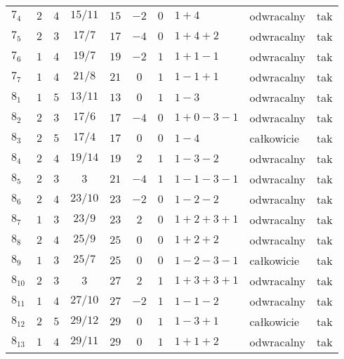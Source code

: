 \begin{longtable}{lccccccllc}
$7_{4}$     &  $2$     &  $4$  &  $15/11$  &  $15$   &  $-2$  &  $0$  &  $1+4$          &  odwracalny  &  tak  \\
$7_{5}$     &  $2$     &  $3$  &  $17/7$   &  $17$   &  $-4$  &  $0$  &  $1+4+2$        &  odwracalny  &  tak  \\
$7_{6}$     &  $1$     &  $4$  &  $19/7$   &  $19$   &  $-2$  &  $1$  &  $1+1-1$        &  odwracalny  &  tak  \\
$7_{7}$     &  $1$     &  $4$  &  $21/8$   &  $21$   &  $0$   &  $1$  &  $1-1+1$        &  odwracalny  &  tak  \\
$8_{1}$     &  $1$     &  $5$  &  $13/11$  &  $13$   &  $0$   &  $1$  &  $1-3$          &  odwracalny  &  tak  \\
$8_{2}$     &  $2$     &  $3$  &  $17/6$   &  $17$   &  $-4$  &  $0$  &  $1+0-3-1$      &  odwracalny  &  tak  \\
$8_{3}$     &  $2$     &  $5$  &  $17/4$   &  $17$   &  $0$   &  $0$  &  $1-4$          &  całkowicie  &  tak  \\
$8_{4}$     &  $2$     &  $4$  &  $19/14$  &  $19$   &  $2$   &  $1$  &  $1-3-2$        &  odwracalny  &  tak  \\
$8_{5}$     &  $2$     &  $3$  &  $3$      &  $21$   &  $-4$  &  $1$  &  $1-1-3-1$      &  odwracalny  &  tak  \\
$8_{6}$     &  $2$     &  $4$  &  $23/10$  &  $23$   &  $-2$  &  $0$  &  $1-2-2$        &  odwracalny  &  tak  \\
$8_{7}$     &  $1$     &  $3$  &  $23/9$   &  $23$   &  $2$   &  $0$  &  $1+2+3+1$      &  odwracalny  &  tak  \\
$8_{8}$     &  $2$     &  $4$  &  $25/9$   &  $25$   &  $0$   &  $0$  &  $1+2+2$        &  odwracalny  &  tak  \\
$8_{9}$     &  $1$     &  $3$  &  $25/7$   &  $25$   &  $0$   &  $0$  &  $1-2-3-1$      &  całkowicie  &  tak  \\
$8_{10}$    &  $2$     &  $3$  &  $3$      &  $27$   &  $2$   &  $1$  &  $1+3+3+1$      &  odwracalny  &  tak  \\
$8_{11}$    &  $1$     &  $4$  &  $27/10$  &  $27$   &  $-2$  &  $1$  &  $1-1-2$        &  odwracalny  &  tak  \\
$8_{12}$    &  $2$     &  $5$  &  $29/12$  &  $29$   &  $0$   &  $1$  &  $1-3+1$        &  całkowicie  &  tak  \\
$8_{13}$    &  $1$     &  $4$  &  $29/11$  &  $29$   &  $0$   &  $1$  &  $1+1+2$        &  odwracalny  &  tak  \\

\end{longtable}
